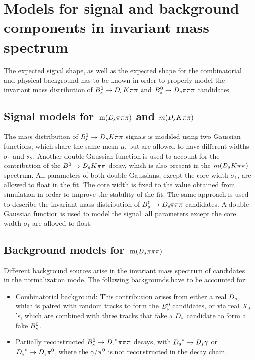 \section{Models for signal and background components in invariant mass spectrum}
\label{sec: model}

The expected signal shape, as well as the expected shape for the combinatorial and physical background has to be known in order to properly model the invariant mass distribution of 
${{B}^0_{s}}\rightarrow{\ensuremath{{D}_{s}}}{\ensuremath{K}}{\ensuremath{\pi}}{\ensuremath{\pi}}$ and ${{B}^0_{s}}\rightarrow{\ensuremath{{D}_{s}}}{\ensuremath{\pi}}{\ensuremath{\pi}}{\ensuremath{\pi}}$ candidates.

\subsection{Signal models for $\mathrm{ \,m}({{D}_{s}}{\pi}{\pi}{\pi})$ and $m({{D}_{s}}{K}{\pi}{\pi})$}
\label{subsec: signalmodel}
The mass distribution of ${{B}^0_{s}}\rightarrow{\ensuremath{{D}_{s}}}{\ensuremath{K}}{\ensuremath{\pi}}{\ensuremath{\pi}}$ signals is modeled using two Gaussian functions, which share the same mean $\mu$, but are allowed to have different widths $\sigma_{1}$ and $\sigma_{2}$. 
Another double Gaussian function is used to account for the contribution of the ${B}^{0}\rightarrow{\ensuremath{{D}_{s}}}{\ensuremath{K}}{\ensuremath{\pi}}{\ensuremath{\pi}}$ decay, which is also present in the $m({{D}_{s}}{K}{\pi}{\pi})$ spectrum. 
All parameters of both double Gaussians, except the core width $\sigma_{1}$, are allowed to float in the fit. 
The core width is fixed to the value obtained from simulation in order to improve the stability of the fit. \newline
The same approach is used to describe the invariant mass distribution of ${{B}^0_{s}}\rightarrow{\ensuremath{{D}_{s}}}{\ensuremath{\pi}}{\ensuremath{\pi}}{\ensuremath{\pi}}$ candidates. 
A double Gaussian function is used to model the signal, all parameters except the core width $\sigma_{1}$ are allowed to float.

\subsection{Background models for $\mathrm{ \,m}({{D}_{s}}{\pi}{\pi}{\pi})$} 
\label{subsec: BkginNorm}
Different background sources arise in the invariant mass spectrum of candidates in the normalization mode. \newline
The following backgrounds have to be accounted for:
\begin{itemize}

\item Combinatorial background: This contribution arises from either a real ${{D}_{s}}$, which is paired with random tracks to form the ${{B}^0_{s}}$ candidates, or via real $X_{d}$'s, which are combined with three tracks that fake a ${{D}_{s}}$ candidate to form a fake ${{B}^0_{s}}$.   

\item Partially reconstructed ${{B}^0_{s}}\rightarrow{\ensuremath{{D}_{s}}}^{*}{\pi}{\pi}{\pi}$ decays, with ${{D}_{s}}^{*}\rightarrow{\ensuremath{{D}_{s}}}\gamma$ or ${{D}_{s}}^{*}\rightarrow{\ensuremath{{D}_{s}}}{\ensuremath{{\pi}^0}}$, where the $\gamma$/${{\pi}^0}$ is not reconstructed in the decay chain. 

\end{itemize}

